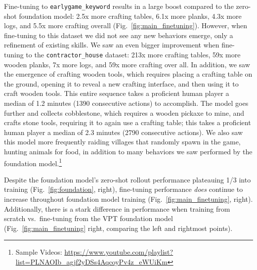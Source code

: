 Fine-tuning to \texttt{earlygame\_keyword} results in a large boost compared to the zero-shot foundation model: 2.5x more crafting tables, 6.1x more planks, 4.3x more logs, and 5.5x more crafting overall (Fig.~\ref{fig:main_finetuning}).
However, when fine-tuning to this dataset we did not see any new behaviors emerge, only a refinement of existing skills. We saw an even bigger improvement when fine-tuning to the \texttt{contractor\_house} dataset: 213x more crafting tables, 59x more wooden planks, 7x more logs, and 59x more crafting over all. In addition, we saw the emergence of crafting wooden tools, which requires placing a crafting table on the ground, opening it to reveal a new crafting interface, and then using it to craft wooden tools. This entire sequence takes a proficient human player a median of 1.2 minutes (1390 consecutive actions) to accomplish. The model goes further and collects cobblestone, which requires a wooden pickaxe to mine, and crafts stone tools, requiring it to again use a crafting table; this takes a proficient human player a median of 2.3 minutes (2790 consecutive actions). We also saw this model more frequently raiding villages that randomly spawn in the game, hunting animals for food, in addition to many behaviors we saw performed by the foundation model.\footnote{Sample Videos: \href{https://www.youtube.com/playlist?list=PLNAOIb\_agjf2yDSs4AqcoyPv4z\_eWUiKm}{https://www.youtube.com/playlist?list=PLNAOIb\_agjf2yDSs4AqcoyPv4z\_eWUiKm}}

Despite the foundation model's zero-shot rollout performance plateauing 1/3 into training (Fig.~\ref{fig:foundation}, right), fine-tuning performance \textit{does} continue to increase throughout foundation model training (Fig.~\ref{fig:main_finetuning}, right).
Additionally, there is a stark difference in performance when training from scratch vs.\ fine-tuning from the VPT foundation model (Fig.~\ref{fig:main_finetuning} right, comparing the left and rightmost points).